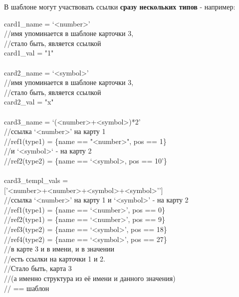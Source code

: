 \documentclass{book}
\newcommand{\less}{\textless}
\newcommand{\more}{\textgreater}
\begin{document}
В шаблоне могут участвовать ссылки \textbf{сразу нескольких типов} - например:




\begin{tcolorbox}[breakable]
card1\_name = `\less number\more' \\
//имя упоминается в шаблоне карточки 3, \\ 
//стало быть, является ссылкой \\
card1\_val = "1" \\
\\
card2\_name = `\less symbol\more' \\
//имя упоминается в шаблоне карточки 3, \\ 
//стало быть, является ссылкой \\
card2\_val = "x" \\
\\
card3\_name = `(\less number\more+\less symbol\more)*2' \\ 
//ссылка `\less number\more' на карту 1 \\
//ref1(type1) = \{name == "\less number\more", pos == 1\} \\
//и `\less symbol\more` - на карту 2 \\
//ref2(type2) = \{name == `\less symbol\more, pos == 10'\} \\
\\
card3\_templ\_vals = \\ 
$[$'\less number\more+\less number\more+\less symbol\more+\less symbol\more''$]$ \\ 
//ссылка `\less number\more' на карту 1 и `\less symbol\more' - на карту 2 \\
//ref1(type1) = \{name == `\less number\more', pos == 0\} \\
//ref2(type1) = \{name == `\less number\more', pos == 9\} \\
//ref3(type2) = \{name == `\less symbol\more', pos == 18\} \\
//ref4(type2) = \{name == `\less symbol\more', pos == 27\} \\
//в карте 3 и в имени, и в значении \\ 
//есть ссылки на карточки 1 и 2. \\ 
//Стало быть, карта 3 \\ 
//(а именно структура из её имени и данного значения) \\
// == шаблон \\
\\

\end{tcolorbox}
\end{document}
